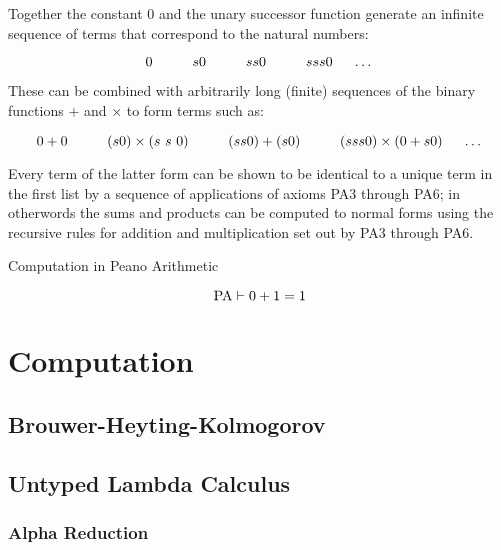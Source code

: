 \documentclass{book}
\begin{document}
    Together the constant 0 and the unary successor function generate an infinite sequence of terms that correspond to the natural numbers: 

    $$0 \hspace{1cm} s 0 \hspace{1cm} s s 0 \hspace{1cm} s s s 0 \hspace{0.5cm} \dots$$

    These can be combined with arbitrarily long (finite) sequences of the binary functions $+$ and $\times$ to form terms such as: 

    $$0 + 0 \hspace{1cm} (s 0) \times (s \ s \ 0) \hspace{1cm} (s s 0) + (s 0) \hspace{1cm} (s s s 0) \times (0 + s 0) \hspace{0.5cm} \dots $$

    Every term of the latter form can be shown to be identical to a unique term in the first list by a sequence of applications of axioms PA3 through PA6; in otherwords the sums and products can be computed to normal forms using the recursive rules for addition and multiplication set out by PA3 through PA6. 

    \begin{eg}{Computation in Peano Arithmetic}

        $$ \text{PA} \vdash 0 + 1 = 1$$

    \end{eg}




\chapter{Computation}

    \newpage
    \section{Brouwer-Heyting-Kolmogorov}

    \newpage
    \section{Untyped Lambda Calculus}

    \subsection*{Alpha Reduction}
\end{document}
